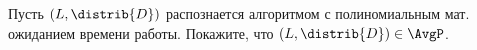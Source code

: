 Пусть $(L, \distrib{D})$ распознается алгоритмом с полиномиальным мат. ожиданием времени
работы. Покажите, что $(L, \distrib{D}) \in \AvgP$. 